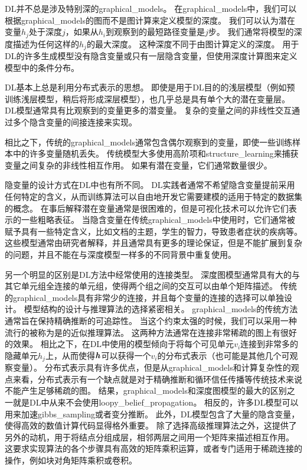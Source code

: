 \gls{DL}并不总是涉及特别深的\gls{graphical_models}。
在\gls{graphical_models}中，我们可以根据\gls{graphical_models}的图而不是图计算来定义模型的深度。
我们可以认为潜在变量$h_j$处于深度$j$，如果从$h_i$到观察到的最短路径变量是$j$步。
我们通常将模型的深度描述为任何这样的$h_j$的最大深度。 
这种深度不同于由图计算定义的深度。
用于\gls{DL}的许多生成模型没有隐含变量或只有一层隐含变量，但使用深度计算图来定义模型中的条件分布。


\gls{DL}基本上总是利用分布式表示的思想。
即使是用于\gls{DL}目的的浅层模型（例如预训练浅层模型，稍后将形成深层模型），也几乎总是具有单个大的潜在变量层。
\gls{DL}模型通常具有比观察到的变量更多的潜变量。
复杂的变量之间的非线性交互通过多个隐含变量的间接连接来实现。


相比之下，传统的\gls{graphical_models}通常包含偶尔观察到的变量，即使一些训练样本中的许多变量随机丢失。
传统模型大多使用高阶项和\gls{structure_learning}来捕获变量之间复杂的非线性相互作用。
如果有潜在变量，它们通常数量很少。



隐变量的设计方式在\gls{DL}中也有所不同。
\gls{DL}实践者通常不希望隐含变量提前采用任何特定的含义，从而训练算法可以自由地开发它需要建模的适用于特定的数据集的概念。
在事后解释潜在变量通常是很困难的，但是可视化技术可以允许它们表示的一些粗略表征。
当隐含变量在传统\gls{graphical_models}中使用时，它们通常被赋予具有一些特定含义，比如文档的主题，学生的智力，导致患者症状的疾病等。
这些模型通常由研究者解释，并且通常具有更多的理论保证，但是不能扩展到复杂的问题，并且不能在与深度模型一样多的不同背景中重复使用。


另一个明显的区别是\gls{DL}方法中经常使用的连接类型。
深度图模型通常具有大的与其它单元组全连接的单元组，使得两个组之间的交互可以由单个矩阵描述。
传统的\gls{graphical_models}具有非常少的连接，并且每个变量的连接的选择可以单独设计。
模型结构的设计与推理算法的选择紧密相关。
\gls{graphical_models}的传统方法通常旨在保持精确推断的可追踪性。
当这个约束太强的时候，我们可以采用一种流行的被称为是的近似推理算法。
这两种方法通常在连接非常稀疏的图上有很好的效果。
相比之下，在\gls{DL}中使用的模型倾向于将每个可见单元$v_i$连接到非常多的隐藏单元$h_j$上，从而使得$\boldsymbol{\mathit{h}}$可以获得一个$v_i$的分布式表示（也可能是其他几个可观察变量）。
分布式表示具有许多优点，但是从\gls{graphical_models}和计算复杂性的观点来看，分布式表示有一个缺点就是对于精确推断和循环信任传播等传统技术来说不能产生足够稀疏的图。
结果，\gls{graphical_models}和深度图模型的最大的区别之一就是\gls{DL}中从来不会使用\gls{loopy_belief_propagation}。
相反的，许多\gls{DL}模型可以用来加速\gls{gibbs_sampling}或者变分推断。
此外，\gls{DL}模型包含了大量的隐含变量，使得高效的数值计算代码显得格外重要。
除了选择高级推理算法之外，这提供了另外的动机，用于将结点分组成层，相邻两层之间用一个矩阵来描述相互作用。
这要求实现算法的各个步骤具有高效的矩阵乘积运算，或者专门适用于稀疏连接的操作，例如块对角矩阵乘积或卷积。



